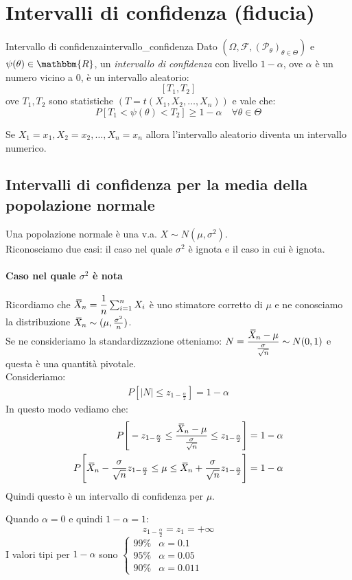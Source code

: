 \documentclass[12pt]{report}
\newcounter{definition}
\newcommand{\nmu}{}
\newcommand{\wbar}[1]{%
	\accentset{\mbox{\rule{0.55em}{0.5pt}}}{#1}%
}
\begin{document}
	 \section{Intervalli di confidenza (fiducia)}
	 \begin{definition}{\nmu Intervallo di confidenza}{intervallo_confidenza}
	 	Dato $(\Omega, \mathcal{F}, (\mathcal{P}_{\theta})_{\theta \in \Theta})$ e $\psi(\theta) \in \mathbbm{R}$, un \textit{intervallo di confidenza} con livello $1 - \alpha$, ove $\alpha$ è un numero vicino a 0, è un intervallo aleatorio:
	 	\[
	 	[T_1, T_2]
	 	\]
	 	ove $T_1, T_2$ sono statistiche $(T = t(X_1, X_2, \dots, X_n))$ e vale che:
	 	\[
	 	P[T_1 < \psi(\theta) < T_2] \geq 1 - \alpha \quad \forall \theta \in \Theta
	 	\]
	 \end{definition}
	 \begin{note}{}{}
	 	Se $X_1 = x_1, X_2 = x_2, \dots, X_n = x_n$ allora l'intervallo aleatorio diventa un intervallo numerico.
	 \end{note}
	 \subsection{Intervalli di confidenza per la media della popolazione normale}
	 Una popolazione normale è una v.a. $X \sim N(\mu, \sigma^2)$. \\
	 Riconosciamo due casi: il caso nel quale $\sigma^2$ è ignota e il caso in cui è ignota.
	 \paragraph{Caso nel quale $\sigma^2$ è nota} Ricordiamo che $\wbar{X}_n = \dfrac{1}{n}\sum_{i=1}^{n}X_i$ è uno stimatore corretto di $\mu$ e ne conosciamo la distribuzione $\wbar{X}_n \sim(\mu, \frac{\sigma^2}{n})$. \\
	 Se ne consideriamo la standardizzazione otteniamo: $N = \dfrac{\wbar{X}_n - \mu}{\frac{\sigma}{\sqrt{n}}} \sim N(0, 1)$ e questa è una quantità pivotale. \\
	 Consideriamo:
	 \begin{align*}
	 	P[|N| \leq z_{1 - \frac{\alpha}{2}}] = 1-\alpha
	 \end{align*}
	 In questo modo vediamo che:
	 \begin{align*}
	 	P\Bigg[-z_{1-\frac{\alpha}{2}} \leq \dfrac{\wbar{X}_n - \mu}{\frac{\sigma}{\sqrt{n}}} \leq z_{1 - \frac{\alpha}{2}}\Bigg] &= 1 - \alpha \\
	 	P\Bigg[\wbar{X}_n-\frac{\sigma}{\sqrt{n}}z_{1-\frac{\alpha}{2}} \leq \mu \leq \wbar{X}_n + \frac{\sigma}{\sqrt{n}}z_{1 - \frac{\alpha}{2}}\Bigg] &= 1 - \alpha
	 \end{align*}
	 Quindi questo è un intervallo di confidenza per $\mu$.
	 \begin{note}{}{}
	 	Quando $\alpha = 0$ e quindi $1 - \alpha = 1$:
	 	\[
	 	z_{1 - \frac{\alpha}{2}} = z_1 = +\infty
	 	\]
	 	I valori tipi per $1 - \alpha$ sono $\begin{cases}
	 		99\% & \alpha = 0.1\\
	 		95\% & \alpha = 0.05\\
	 		90\% & \alpha = 0.011
	 	\end{cases}$
	 \end{note}
\end{document}
